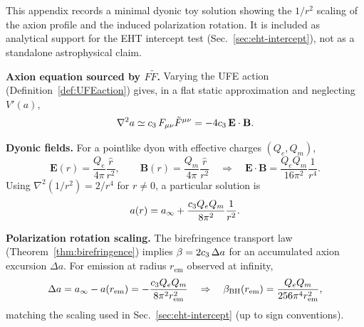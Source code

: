 \begin{tcolorbox}[colback=yellow!3, colframe=yellow!60!black, breakable,
title={\textbf{Scope (toy model; not a kernel claim)}}, fonttitle=\bfseries\small]
This appendix records a minimal dyonic toy solution showing the $1/r^2$ scaling of the axion profile and the induced polarization rotation.
It is included as analytical support for the EHT intercept test (Sec.~\ref{sec:eht-intercept}), not as a standalone astrophysical claim.
\end{tcolorbox}

\textbf{Axion equation sourced by $F\tilde F$.}
Varying the UFE action (Definition~\ref{def:UFEaction}) gives, in a flat static approximation and neglecting $V'(a)$,
\begin{equation}
\nabla^2 a \simeq c_3\, F_{\mu\nu}\tilde F^{\mu\nu} = -4c_3\,\mathbf{E}\cdot\mathbf{B}.
\end{equation}

\textbf{Dyonic fields.}
For a pointlike dyon with effective charges $(Q_e,Q_m)$,
\begin{equation}
\mathbf{E}(r)=\frac{Q_e}{4\pi}\frac{\hat r}{r^2},\qquad
\mathbf{B}(r)=\frac{Q_m}{4\pi}\frac{\hat r}{r^2}
\quad\Rightarrow\quad
\mathbf{E}\cdot\mathbf{B}=\frac{Q_eQ_m}{16\pi^2}\frac{1}{r^4}.
\end{equation}
Using $\nabla^2 (1/r^2)=2/r^4$ for $r\neq 0$, a particular solution is
\begin{equation}
a(r)=a_\infty+\frac{c_3 Q_e Q_m}{8\pi^2}\frac{1}{r^2}.
\end{equation}

\textbf{Polarization rotation scaling.}
The birefringence transport law (Theorem~\ref{thm:birefringence}) implies $\beta = 2c_3\,\Delta a$ for an accumulated axion excursion $\Delta a$.
For emission at radius $r_{\mathrm{em}}$ observed at infinity,
\begin{equation}
\Delta a = a_\infty - a(r_{\mathrm{em}}) = -\frac{c_3 Q_e Q_m}{8\pi^2 r_{\mathrm{em}}^2}
\quad\Rightarrow\quad
\beta_{\mathrm{BH}}(r_{\mathrm{em}})=\frac{Q_e Q_m}{256\pi^4 r_{\mathrm{em}}^2},
\end{equation}
matching the scaling used in Sec.~\ref{sec:eht-intercept} (up to sign conventions).\hfill\cite{blackHolesBh1Note2025}

